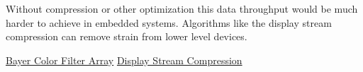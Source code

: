 \documentclass[10pt,a4paper]{article}
\begin{document}
Without compression or other optimization this data throughput would be much harder to achieve in embedded systems. Algorithms like the display stream compression can remove strain from lower level devices.\cite{Display Stream Compression}


\begin{thebibliography}{9}
\href{https://kimon.hosting.nyu.edu/physical-electrical-digital/items/show/1083}{Bayer Color Filter Array}
\href{https://en.wikipedia.org/wiki/Display_Stream_Compression}{Display Stream Compression}

\end{thebibliography}
\end{document}
